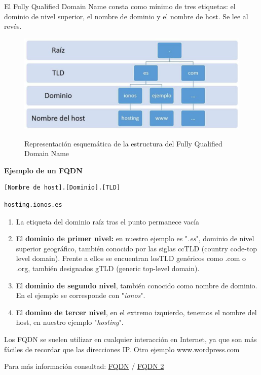 \documentclass{article}
\begin{document}
El Fully Qualified Domain Name consta como mínimo de tres etiquetas: el dominio de nivel superior, el nombre de dominio y el nombre de host. Se lee al revés.

\begin{figure}[H]
    \centering
    \includegraphics[scale=0.4]{pictures/image11.PNG}
    \label{FQDN Image}
    \caption{Representación esquemática de la estructura del Fully Qualified Domain Name}
\end{figure}

\textbf{Ejemplo de un FQDN}
\begin{verbatim}
[Nombre de host].[Dominio].[TLD]
\end{verbatim}
\begin{verbatim}
hosting.ionos.es
\end{verbatim}
\begin{enumerate}
    \item La etiqueta del dominio raíz tras el punto permanece vacía
    \item El \textbf{dominio de primer nivel:} en nuestro ejemplo es "\textit{.es}", dominio de nivel superior geográfico, también conocido por las siglas ccTLD (country code-top level domain). Frente a ellos se encuentran losTLD genéricos como .com o .org, también designados gTLD (generic top-level domain).
    \item El \textbf{dominio de segundo nivel}, también conocido como nombre de dominio.  En el ejemplo se corresponde con "\textit{ionos}".
    \item El \textbf{domino de tercer nivel}, en el extremo izquierdo, tenemos el nombre del host, en nuestro ejemplo "\textit{hosting}".
\end{enumerate}

Los FQDN se suelen utilizar en cualquier interacción en Internet, ya que son más fáciles de recordar que las direcciones IP. Otro ejemplo www.wordpress.com


Para más información consultad: \href{https://www.ionos.es/digitalguide/dominios/gestion-de-dominios/fully-qualified-domain-name/}{FQDN}
/ \href{https://www.hostinger.es/tutoriales/fqdn}{FQDN 2}
\end{document}

